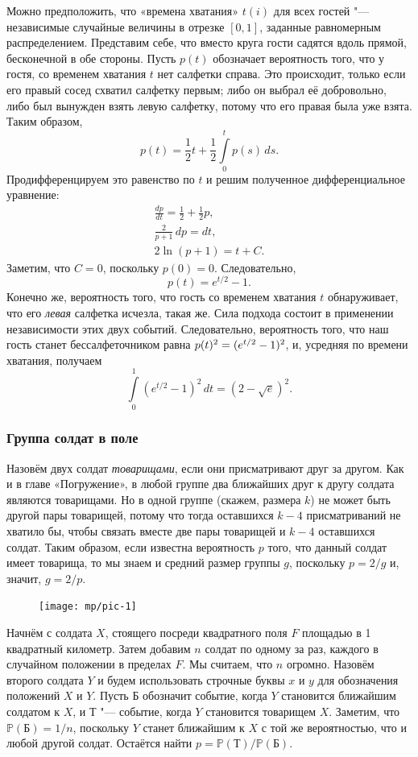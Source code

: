 \documentclass[twoside]{book}
\begin{document}
Можно предположить, что «времена хватания» $t(i)$ для всех гостей "--- независимые случайные величины в отрезке $[0,1]$, заданные равномерным распределением.
Представим себе, что вместо круга гости садятся вдоль прямой, бесконечной в обе стороны.
Пусть $p(t)$ обозначает вероятность того, что у гостя, со временем хватания $t$ нет салфетки справа.
Это происходит, только если его правый сосед схватил салфетку первым;
либо он выбрал её добровольно,
либо был вынужден взять левую салфетку, потому что его правая была уже взята.
Таким образом,
\[p(t)=\frac12t+\frac12\int\limits_0^tp(s)\,ds.\]
Продифференцируем это равенство по $t$ и решим полученное дифференциальное уравнение:
\begin{gather*}
\frac{dp}{dt}=\frac12+\frac12p,
\\
\frac2{p+1}\,dp=dt,
\\
2\ln(p+1)=t+C.
\end{gather*}
Заметим, что $C=0$, поскольку $p(0)=0$.
Следовательно,
\[p(t) = e^{t/2} - 1.\]
Конечно же, вероятность того, что гость со временем хватания $t$ обнаруживает, что его \emph{левая} салфетка исчезла, такая же.
Сила подхода состоит в применении независимости этих двух событий.
Следовательно, вероятность того, что наш гость станет бессалфеточником равна $p(t)^2 \z= (e^{t/2} -1)^2$, и, усредняя по времени хватания, получаем
\[\int\limits_0^1(e^{t/2}-1)^2\,dt=(2-\sqrt{e})^2.\]
\heartf

\subsubsection*{Группа солдат в поле}

Назовём двух солдат \emph{товарищами}, если они присматривают друг за другом.
Как и в главе «Погружение», в любой группе два ближайших друг к другу солдата являются товарищами.
Но в одной группе (скажем, размера $k$) не может быть другой пары товарищей, потому что тогда оставшихся $k-4$ присматриваний не хватило бы, чтобы связать вместе две пары товарищей и $k-4$ оставшихся солдат.
Таким образом, если известна вероятность $p$ того, что данный солдат имеет товарища, то мы знаем и средний размер группы $g$, поскольку $p = 2/g$ и, значит, $g = 2/p$.

\begin{figure}[!ht]
\centering
\texttt{[image: mp/pic-1]} %
\end{figure}

Начнём с солдата $X$, стоящего посреди квадратного поля $F$ площадью в 1 квадратный километр.
Затем добавим $n$ солдат по одному за раз, каждого в случайном положении в пределах $F$. 
Мы считаем, что $n$ огромно.
Назовём второго солдата $Y$ и будем использовать строчные буквы $x$ и $y$ для обозначения положений $X$ и $Y$.
Пусть $\text{Б}$ обозначит событие, когда $Y$ становится ближайшим солдатом к $X$, 
и $\text{Т}$ "--- событие, когда $Y$ становится товарищем $X$.
Заметим, что $\mathbb{P}(\text{Б})=1/n$, поскольку $Y$ станет ближайшим к $X$ с той же вероятностью, что и любой другой солдат.
Остаётся найти $p=\mathbb{P}(\text{Т})/\mathbb{P}(\text{Б})$.
\end{document}
